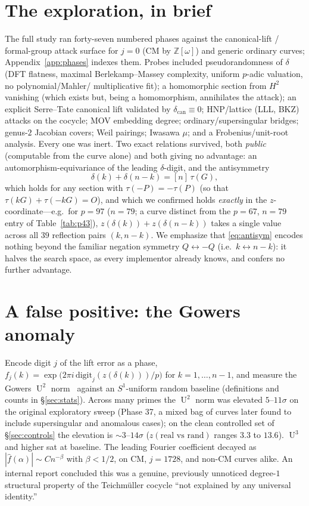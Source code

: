 \documentclass[11pt]{article}
\theoremstyle{definition}
\newcommand{\Z}{\mathbb{Z}}
\DeclareMathOperator{\Uk}{U}
\begin{document}
\section{The exploration, in brief}\label{sec:exploration}

The full study ran forty-seven numbered phases against the canonical-lift /
formal-group attack surface for $j=0$ (CM by $\Z[\omega]$) and generic
ordinary curves; Appendix~\ref{app:phases} indexes them. Probes included
pseudorandomness of $\delta$ (DFT flatness, maximal Berlekamp--Massey
complexity, uniform $p$-adic valuation, no polynomial/Mahler/%
multiplicative fit); a homomorphic section from $H^2$ vanishing (which
exists but, being a homomorphism, annihilates the attack); an explicit
Serre--Tate canonical lift validated by $\delta_{\mathrm{can}}\equiv 0$;
HNP/lattice (LLL, BKZ) attacks on the cocycle; MOV embedding degree;
ordinary/supersingular bridges; genus-$2$ Jacobian covers; Weil pairings;
Iwasawa $\mu$; and a Frobenius/unit-root analysis. Every one was inert.
Two exact relations survived, both \emph{public} (computable from the
curve alone) and both giving no advantage: an automorphism-equivariance
of the leading $\delta$-digit, and the antisymmetry
\begin{equation}\label{eq:antisym}
\delta(k)+\delta(n-k)=[n]\,\tau(G),
\end{equation}
which holds for any section with $\tau(-P)=-\tau(P)$ (so that
$\tau(kG)+\tau(-kG)=O$), and which we confirmed holds \emph{exactly} in
the $z$-coordinate---e.g.\ for $p=97$ ($n=79$; a curve distinct from the
$p=67$, $n=79$ entry of Table~\ref{tab:p43}),
$z(\delta(k))+z(\delta(n-k))$ takes a single value across all $39$
reflection pairs $(k,n-k)$. We emphasize that \eqref{eq:antisym} encodes
nothing beyond the familiar negation symmetry $Q\leftrightarrow-Q$ (i.e.\
$k\leftrightarrow n-k$): it halves the search space, as every implementor
already knows, and confers no further advantage.

\section{A false positive: the Gowers anomaly}\label{sec:falsepos}

Encode digit $j$ of the lift error as a phase,
$f_j(k)=\exp\!\big(2\pi i\,\mathrm{digit}_j(z(\delta(k)))/p\big)$ for
$k=1,\dots,n-1$, and measure the Gowers $\Uk^2$ norm~\cite{taovu} against an
$S^1$-uniform random baseline (definitions and counts in
\S\ref{sec:stats}). Across many primes the $\Uk^2$ norm was elevated
$5$--$11\sigma$ on the original exploratory sweep (Phase 37, a mixed bag
of curves later found to include supersingular and anomalous cases); on
the clean controlled set of \S\ref{sec:controls} the elevation is
$\sim$$3$--$14\sigma$ ($z(\text{real vs rand})$ ranges $3.3$ to $13.6$).
$\Uk^3$ and higher sat at baseline. The leading Fourier
coefficient decayed as $|\hat f(\alpha)|\sim C n^{-\beta}$ with
$\beta<1/2$, on CM, $j{=}1728$, and non-CM curves alike. An internal
report concluded this was a genuine, previously unnoticed degree-$1$
structural property of the Teichm\"uller cocycle ``not explained by any
universal identity.''
\end{document}
